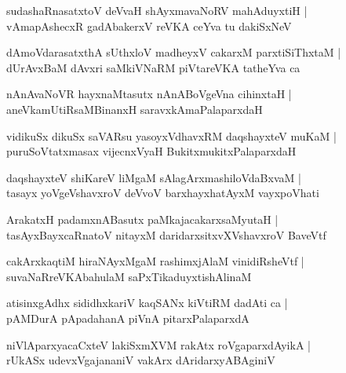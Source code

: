 \documentclass[twoside,12pt,openright]{book}
\newcounter{shloka}[chapter]
\begin{document}
\begin{shloka}%
sudashaRnasatxtoV deVvaH shAyxmavaNoRV mahAduyxtiH |\\
vAmapAshecxR gadAbakerxV reVKA ceYva tu dakiSxNeV 
\end{shloka}

\begin{shloka}%
dAmoVdarasatxthA sUthxloV madheyxV cakarxM parxtiSiThxtaM |\\
dUrAvxBaM dAvxri saMkiVNaRM piVtareVKA tatheYva ca 
\end{shloka}

\begin{shloka}%
nAnAvaNoVR hayxnaMtasutx nAnABoVgeVna cihinxtaH |\\
aneVkamUtiRsaMBinanxH saravxkAmaPalaparxdaH 
\end{shloka}

\begin{shloka}%
vidikuSx dikuSx saVARsu yasoyxVdhavxRM daqshayxteV muKaM |\\
puruSoVtatxmasax vijecnxVyaH BukitxmukitxPalaparxdaH 
\end{shloka}

\begin{shloka}%
daqshayxteV shiKareV liMgaM sAlagArxmashiloVdaBxvaM |\\
tasayx yoVgeVshavxroV deVvoV barxhayxhatAyxM vayxpoVhati 
\end{shloka}

\begin{shloka}%
ArakatxH padamxnABasutx paMkajacakarxsaMyutaH |\\
tasAyxBayxcaRnatoV nitayxM daridarxsitxvXVshavxroV BaveVtf 
\end{shloka}

\begin{shloka}%
cakArxkaqtiM hiraNAyxMgaM rashimxjAlaM vinidiRsheVtf |\\
suvaNaRreVKAbahulaM saPxTikaduyxtishAlinaM
\end{shloka}

\begin{shloka}%
atisinxgAdhx sididhxkariV kaqSANx kiVtiRM dadAti ca |\\
pAMDurA pApadahanA piVnA pitarxPalaparxdA 
\end{shloka}

\begin{shloka}%
niVlAparxyacaCxteV lakiSxmXVM rakAtx roVgaparxdAyikA |\\
rUkASx udevxVgajananiV vakArx dAridarxyABAginiV 
\end{shloka}
\end{document}
